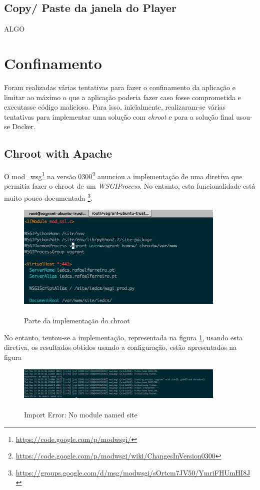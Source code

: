\documentclass[pdftex,12pt,a4paper]{report}
\begin{document}
\subsection{Copy/ Paste da janela do Player}
ALGO


\section{Confinamento}
Foram realizadas várias tentativas para fazer o confinamento da aplicação e limitar ao máximo o que a aplicação poderia fazer caso fosse comprometida e executasse código malicioso. Para isso, inicialmente, realizaram-se várias tentativas para implementar uma solução com \textit{chroot} e para a solução final usou-se Docker.

\subsection{Chroot with Apache}
O mod\_wsg\footnote{\label{url1} \url{https://code.google.com/p/modwsgi/}} na versão 0300\footnote{\label{url1} \url{https://code.google.com/p/modwsgi/wiki/ChangesInVersion0300}} anunciou a implementação de uma diretiva que permitia fazer o chroot de um \textit{WSGIProcess}. No entanto, esta funcionalidade está muito pouco documentada \footnote{\label{url1} \url{https://groups.google.com/d/msg/modwsgi/sOrtcm7JV50/YmriFHUmHI8J}}.

\begin{figure}[!htb]
\center
 \includegraphics[width=100mm,scale=1]{apache_chroot_config.png}
 \caption{\\Parte da implementação do chroot}
 \label{fig:apache_chroot_config}
\end{figure}

No entanto, tentou-se a implementação, representada na figura \ref{fig:apache_chroot_config}, usando esta diretiva, os resultados obtidos usando a configuração, estão apresentados na figura ~ 

\begin{figure}[!htb]
\center
 \includegraphics[width=100mm,scale=1]{import_error.png}
 \caption{\\Import Error: No module named site}
 \label{fig:import_Error}
\end{figure}
\end{document}
